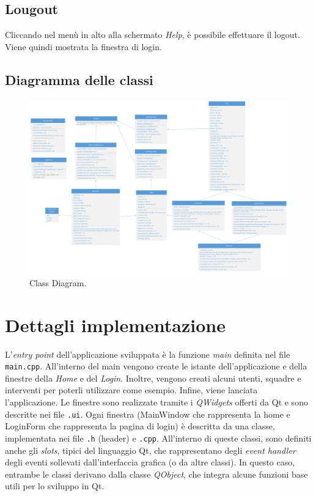 \subsection{Lougout}
Cliccando nel menù in alto alla schermato \textit{Help}, è possibile effettuare il logout. Viene quindi mostrata la finestra di login.

\begin{landscape}
	\section{Diagramma delle classi}
	\begin{figure}[h!]
		\centering
		\includegraphics[width=0.9\linewidth]{./OtherFiles/Class Diagram}
		\caption{Class Diagram.}
		\label{fig:class_diagram}
	\end{figure}
\end{landscape}

\section{Dettagli implementazione}
L'\textit{entry point} dell'applicazione sviluppata è la funzione \textit{main} definita nel file \texttt{main.cpp}. All'interno del main vengono create le istante dell'applicazione e della finestre della \textit{Home} e del \textit{Login}. Inoltre, vengono creati alcuni utenti, squadre e interventi per poterli utilizzare come esempio. Infine, viene lanciata l'applicazione. Le finestre sono realizzate tramite i \textit{QWidgets} offerti da Qt e sono descritte nei file \texttt{.ui}. Ogni finestra (MainWindow che rappresenta la home e LoginForm che rappresenta la pagina di login) è descritta da una classe, implementata nei file \texttt{.h} (header) e \texttt{.cpp}. All'interno di queste classi, sono definiti anche gli \textit{slots}, tipici del linguaggio Qt, che rappresentano degli \textit{event handler} degli eventi sollevati dall'interfaccia grafica (o da altre classi). In questo caso, entrambe le classi derivano dalla classe \textit{QObject}, che integra alcune funzioni base utili per lo sviluppo in Qt.


